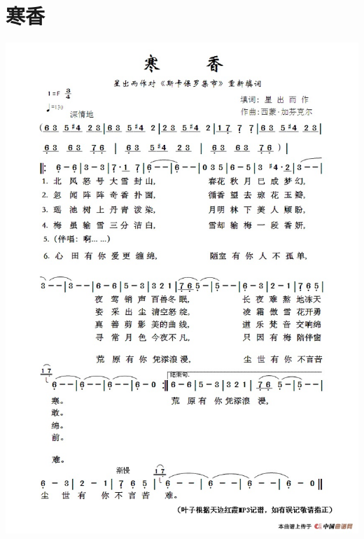 \documentclass[cn,pad,chinese,chinesefont=nofont]{elegantbook}
\begin{document}
\section{寒香}
    \includegraphics[width=\textwidth]{dongxiao/202003231845寒香.jpg}
    
\end{document}
